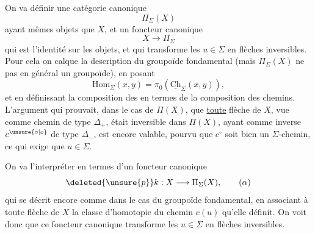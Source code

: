 On va définir une catégorie canonique
\[\Pi_\Sigma(X)\]
ayant mêmes objets que $X$, et un foncteur canonique
\[X\longrightarrow\Pi_\Sigma\]
 qui est l'identité sur les objets, et qui transforme les $u\in\Sigma$ en flèches inversibles. Pour cela on calque la  description du groupoïde fondamental (mais $\Pi_\Sigma(X)$ ne  pas en général un groupoïde), en posant
\[\mathrm{Hom}_\Sigma(x,y)=\pi_0(\underline{\mathrm{Ch}}_\Sigma(x,y)),\]
et en définissant la composition des  en termes de la composition des chemins.
L'argument qui prouvait,  dans le cas de $\Pi(X)$, que \uline{toute} flèche  de $X$, vue comme chemin  de type $\Delta_+$, était inversible dans $\Pi(X)$,  ayant comme inverse $c^{\unsure{\circ|o}}$ de type $\Delta_-$, est encore valable, pourvu que $c^\circ$ soit  bien un $\Sigma$-chemin, ce qui exige que $u\in\Sigma$. 

On va l'interpréter en termes d'un foncteur canonique
\[\deleted{\unsure{p}}k:X\longrightarrow\Pi_\Sigma(X),\tag*{$(\alpha)$}\]
qui se décrit encore comme dans le cas du groupoïde fondamental, en associant à toute flèche  de $X$ la classe d'homotopie du chemin $c(u)$ qu'elle définit. On voit donc que ce foncteur canonique transforme les $u\in\Sigma$ en flèches inversibles.

